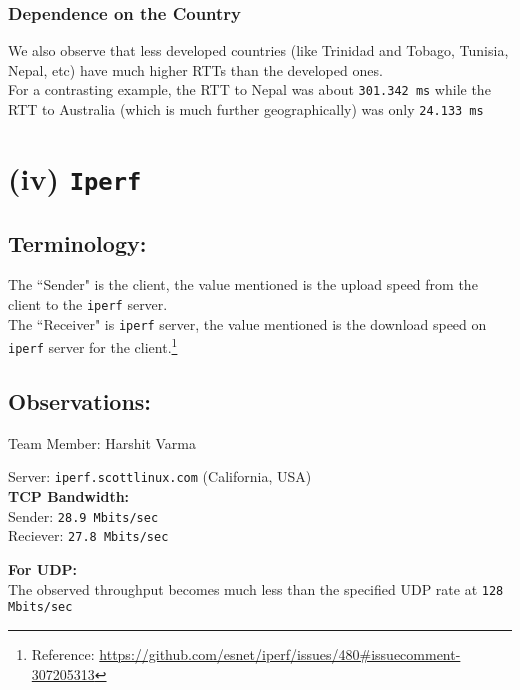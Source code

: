 \documentclass[11pt, fleqn]{article}
\begin{document}
\subsubsection*{Dependence on the Country}
We also observe that less developed countries (like Trinidad and Tobago, Tunisia, Nepal, etc) have much higher RTTs than the developed ones.\\ 
For a contrasting example, the RTT to Nepal was about \texttt{301.342 ms} while the RTT to Australia (which is much further geographically) was only \texttt{24.133 ms}


\newpage
\section*{(iv) \texttt{Iperf}}
\label{partd}
\setcounter{equation}{0}

\subsection*{Terminology: }


The ``Sender" is the client, the value mentioned is the upload speed from the client to the \texttt{iperf} server.\\
The ``Receiver" is \texttt{iperf} server, the value mentioned is the download speed 
on \texttt{iperf} server for the client.\footnote{Reference: \url{https://github.com/esnet/iperf/issues/480\#issuecomment-307205313}}

\hrulefill

\bigskip 

\subsection*{Observations: }

Team Member: Harshit Varma

\hrulefill
\smallskip


Server: \texttt{iperf.scottlinux.com} (California, USA)\\
\textbf{TCP Bandwidth:}\\
Sender: \texttt{28.9 Mbits/sec}\\
Reciever: \texttt{27.8 Mbits/sec}

\textbf{For UDP:}\\
The observed throughput becomes much less than the specified UDP rate at \texttt{128 Mbits/sec}
\end{document}
